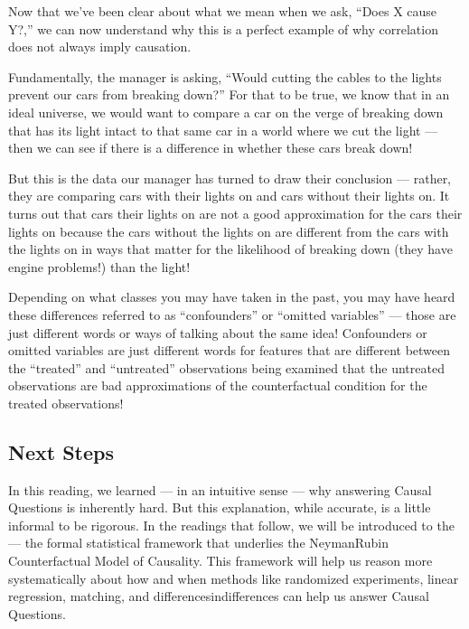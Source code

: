 \documentclass[letterpaper,10pt,english]{jupyterBook}
\begin{document}
\sphinxAtStartPar
Now that we’ve been clear about what we mean when we ask, “Does X cause Y?,” we can now understand why this is a perfect example of why correlation does not always imply causation.

\sphinxAtStartPar
Fundamentally, the manager is asking, “Would cutting the cables to the  lights prevent our cars from breaking down?” For that to be true, we know that in an ideal universe, we would want to compare a car on the verge of breaking down that has its  light intact to that same car in a world where we cut the  light — then we can see if there is a difference in whether these cars break down!

\sphinxAtStartPar
But this is  the data our manager has turned to draw their conclusion — rather, they are comparing cars with their  lights on and cars without their  lights on. It turns out that cars  their  lights on are not a good approximation for the cars  their  lights on because the cars without the lights on are different from the cars with the lights on in ways that matter for the likelihood of breaking down (they have engine problems!)  than the  light!

\sphinxAtStartPar
Depending on what classes you may have taken in the past, you may have heard these differences referred to as “confounders” or “omitted variables” — those are just different words or ways of talking about the same idea! Confounders or omitted variables are just different words for features that are different between the “treated” and “untreated” observations being examined that the untreated observations are bad approximations of the counter\sphinxhyphen{}factual condition for the treated observations!


\subsection{Next Steps}
\label{\detokenize{30_questions/40_answering_causal_questions:next-steps}}
\sphinxAtStartPar
In this reading, we learned — in an intuitive sense — why answering Causal Questions is inherently hard. But this explanation, while accurate, is a little informal to be rigorous. In the readings that follow, we will be introduced to the  — the formal statistical framework that underlies the Neyman\sphinxhyphen{}Rubin Counterfactual Model of Causality. This framework will help us reason more systematically about how and when methods like randomized experiments, linear regression, matching, and differences\sphinxhyphen{}in\sphinxhyphen{}differences can help us answer Causal Questions.
\end{document}
